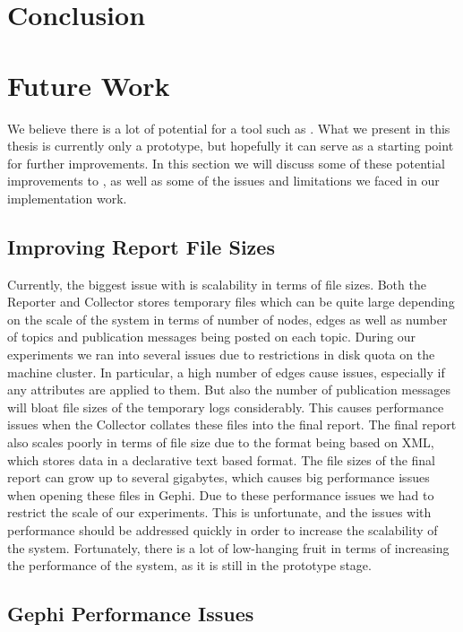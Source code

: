 \section{Conclusion}

\section{Future Work}

We believe there is a lot of potential for a tool such as \demo{}. What
we present in this thesis is currently only a prototype, but hopefully
it can serve as a starting point for further improvements. In this
section we will discuss some of these potential improvements to \demo{},
as well as some of the issues and limitations we faced in our implementation work.

\subsection{Improving Report File Sizes}

Currently, the biggest issue with \demo{} is scalability in terms of
file sizes. Both the Reporter and Collector stores temporary files
which can be quite large depending on the scale of the system in terms
of number of nodes, edges as well as number of topics and publication
messages being posted on each topic. During our experiments we ran into
several issues due to restrictions in disk quota on the machine cluster.
In particular, a high number of edges cause issues, especially if any
attributes are applied to them. But also the number of publication
messages will bloat file sizes of the temporary logs considerably. This
causes performance issues when the Collector collates these files into
the final report. The final report also scales poorly in terms of file
size due to the \gexf{} format being based on XML, which stores data in
a declarative text based format. The file sizes of the final report can
grow up to several gigabytes, which causes big performance issues when
opening these files in Gephi. Due to these performance issues we had to
restrict the scale of our experiments. This is unfortunate, and the
issues with performance should be addressed quickly in order to increase
the scalability of the system. Fortunately, there is a lot of
low-hanging fruit in terms of increasing the performance of the system,
as it is still in the prototype stage.

\subsection{Gephi Performance Issues}


